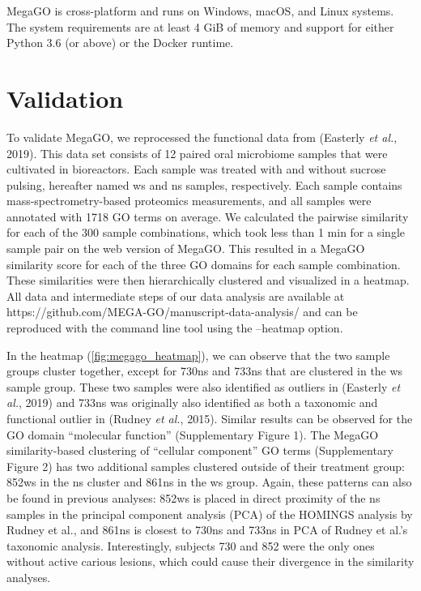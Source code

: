 MegaGO is cross-platform and runs on Windows, macOS, and Linux systems.
The system requirements are at least 4 GiB of memory and support for
either Python 3.6 (or above) or the Docker runtime.

\hypertarget{validation}{%
\section{Validation}\label{validation}}

To validate MegaGO, we reprocessed the functional data from (Easterly
\emph{et al.}, 2019). This data set consists of 12 paired oral
microbiome samples that were cultivated in bioreactors. Each sample was
treated with and without sucrose pulsing, hereafter named ws and ns
samples, respectively. Each sample contains mass-spectrometry-based
proteomics measurements, and all samples were annotated with 1718 GO
terms on average. We calculated the pairwise similarity for each of the
300 sample combinations, which took less than 1 min for a single sample
pair on the web version of MegaGO. This resulted in a MegaGO similarity
score for each of the three GO domains for each sample combination.
These similarities were then hierarchically clustered and visualized in
a heatmap. All data and intermediate steps of our data analysis are
available at https://github.com/MEGA-GO/manuscript-data-analysis/ and
can be reproduced with the command line tool using the --heatmap option.

In the heatmap (\autoref{fig:megago_heatmap}), we can observe that the
two sample groups cluster together, except for 730ns and 733ns that are
clustered in the ws sample group. These two samples were also identified
as outliers in (Easterly \emph{et al.}, 2019) and 733ns was originally
also identified as both a taxonomic and functional outlier in (Rudney
\emph{et al.}, 2015). Similar results can be observed for the GO domain
``molecular function'' (Supplementary Figure 1). The MegaGO
similarity-based clustering of ``cellular component'' GO terms
(Supplementary Figure 2) has two additional samples clustered outside of
their treatment group: 852ws in the ns cluster and 861ns in the ws
group. Again, these patterns can also be found in previous analyses:
852ws is placed in direct proximity of the ns samples in the principal
component analysis (PCA) of the HOMINGS analysis by Rudney et al., and
861ns is closest to 730ns and 733ns in PCA of Rudney et al.'s taxonomic
analysis. Interestingly, subjects 730 and 852 were the only ones without
active carious lesions, which could cause their divergence in the
similarity analyses.

